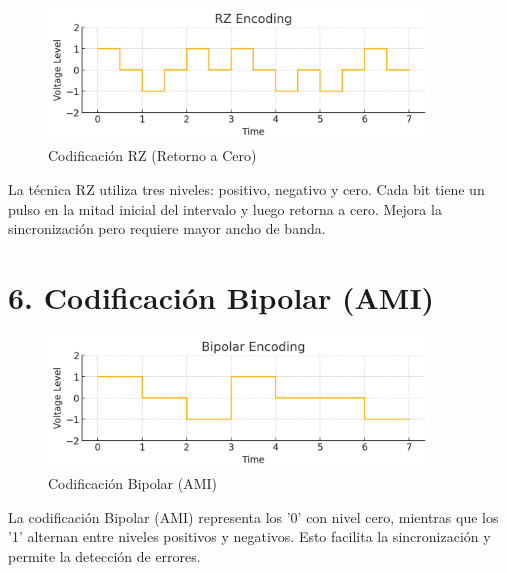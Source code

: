 \documentclass[a4paper,12pt]{article}
\begin{document}
\begin{figure}[h!]
\centering
\includegraphics[width=0.9\textwidth]{rz.png}
\caption{Codificación RZ (Retorno a Cero)}
\end{figure}

La técnica RZ utiliza tres niveles: positivo, negativo y cero. Cada bit tiene un pulso en la mitad inicial del intervalo y luego retorna a cero. Mejora la sincronización pero requiere mayor ancho de banda.


\section*{6. Codificación Bipolar (AMI)}

\begin{figure}[h!]
\centering
\includegraphics[width=0.9\textwidth]{bipolar.png}
\caption{Codificación Bipolar (AMI)}
\end{figure}

La codificación Bipolar (AMI) representa los '0' con nivel cero, mientras que los '1' alternan entre niveles positivos y negativos. Esto facilita la sincronización y permite la detección de errores.
\end{document}
